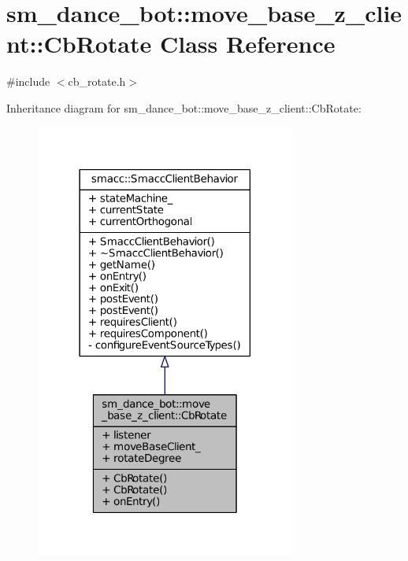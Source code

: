 \hypertarget{classsm__dance__bot_1_1move__base__z__client_1_1CbRotate}{}\section{sm\+\_\+dance\+\_\+bot\+:\+:move\+\_\+base\+\_\+z\+\_\+client\+:\+:Cb\+Rotate Class Reference}
\label{classsm__dance__bot_1_1move__base__z__client_1_1CbRotate}


{\ttfamily \#include $<$cb\+\_\+rotate.\+h$>$}



Inheritance diagram for sm\+\_\+dance\+\_\+bot\+:\+:move\+\_\+base\+\_\+z\+\_\+client\+:\+:Cb\+Rotate\+:
\nopagebreak
\begin{figure}[H]
\begin{center}
\leavevmode
\includegraphics[width=242pt]{classsm__dance__bot_1_1move__base__z__client_1_1CbRotate__inherit__graph}
\end{center}
\end{figure}


